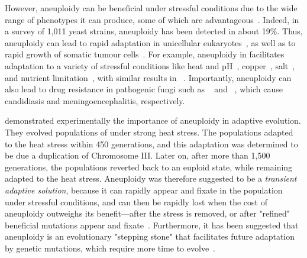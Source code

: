 \documentclass[12pt]{extarticle}
\begin{document}
However, aneuploidy can be beneficial under stressful conditions due to the wide range of phenotypes it can produce, some of which are advantageous~\citep{Pavelka2010, Yang2021}.
Indeed, in a survey of 1,011 yeast strains, aneuploidy has been detected in about 19\%\citep{Peter2018}.
Thus, aneuploidy can lead to rapid adaptation in unicellular eukaryotes~\citep{Gerstein2015,Torres2010, Hong2014, Rancati2008}, as well as to rapid growth of somatic tumour cells~\citep{Schvartzman2010, Sheltzer2017}.
For example, aneuploidy in \yeast facilitates adaptation to a variety of stressful conditions like heat and pH~\citep{Yona2012}, copper~\citep{Covo2014, Gerstein2015}, salt~\citep{Dhar2011}, and nutrient limitation~\citep{Dunham2002, Gresham2008, Avecilla2022}, with similar results in \calbicans~\citep{Yang2021}.
Importantly, aneuploidy can also lead to drug resistance in pathogenic fungi such as \calbicans~\citep{Selmecki2008, Selmecki2010, Gerstein2018} and \cneoformans~\citep{Sionov2010}, which cause candidiasis and meningoencephalitis, respectively.

\citet{Yona2012} demonstrated experimentally the importance of aneuploidy in adaptive evolution. They evolved populations of \yeast under strong heat stress.
The populations adapted to the heat stress within 450 generations, and this adaptation was determined to be due a duplication of Chromosome III.
Later on, after more than 1,500 generations, the populations reverted back to an euploid state, while remaining adapted to the heat stress. 
Aneuploidy was therefore suggested to be a \emph{transient adaptive solution}, because it can rapidly appear and fixate in the population under stressful conditions, and can then be rapidly lost when the cost of aneuploidy outweighs its benefit---after the stress is removed, or after "refined" beneficial mutations appear and fixate~\citep{Yona2012}.
Furthermore, it has been suggested that aneuploidy is an evolutionary "stepping stone" that facilitates future adaptation by genetic mutations, which require more time to evolve~\citep{Yona2012,Yona2015}.
\end{document}
